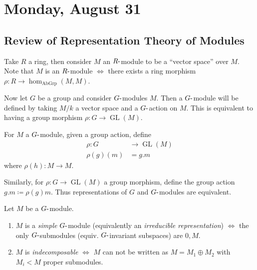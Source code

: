 \hypertarget{monday-august-31}{%
\section{Monday, August 31}\label{monday-august-31}}

\hypertarget{review-of-representation-theory-of-modules}{%
\subsection{Review of Representation Theory of
Modules}\label{review-of-representation-theory-of-modules}}

Take \(R\) a ring, then consider \(M\) an \(R{\hbox{-}}\)module to be a
``vector space'' over \(M\). Note that \(M\) is an \(R{\hbox{-}}\)module
\(\iff\) there exists a ring morphism
\(\rho: R\to \hom_{\text{AbGrp}}(M, M)\).

Now let \(G\) be a group and consider \(G{\hbox{-}}\)modules \(M\). Then
a \(G{\hbox{-}}\)module will be defined by taking \(M/k\) a vector space
and a \(G{\hbox{-}}\)action on \(M\). This is equivalent to having a
group morphism \(\rho: G\to \operatorname{GL}(M)\).

For \(M\) a \(G{\hbox{-}}\)module, given a group action, define
\begin{align*}  
\rho: G&\to \operatorname{GL}(M) \\
\rho(g)(m) &= g.m
\end{align*}
where \(\rho(h): M\to M\).

Similarly, for \(\rho: G\to \operatorname{GL}(M)\) a group morphism,
define the group action \(g.m \coloneqq\rho(g)m\). Thus representations
of \(G\) and \(G{\hbox{-}}\)modules are equivalent.

\begin{definition}[?]

Let \(M\) be a \(G{\hbox{-}}\)module.

\begin{enumerate}
\def\labelenumi{\arabic{enumi}.}
\item
  \(M\) is a \emph{simple} \(G{\hbox{-}}\)module (equivalently an
  \emph{irreducible representation}) \(\iff\) the only
  \(G{\hbox{-}}\)submodules (equiv. \(G{\hbox{-}}\)invariant subspaces)
  are \(0, M\).
\item
  \(M\) is \emph{indecomposable} \(\iff\) \(M\) can not be written as
  \(M = M_1 \oplus M_2\) with \(M_i < M\) proper submodules.
\end{enumerate}

\end{definition}

